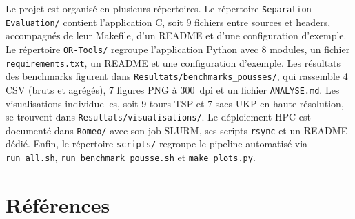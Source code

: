 \documentclass[11pt,a4paper]{article}
\begin{document}
Le projet est organisé en plusieurs répertoires. Le répertoire \texttt{Separation-Evaluation/} contient l'application C, soit 9 fichiers entre sources et headers, accompagnés de leur Makefile, d'un README et d'une configuration d'exemple. Le répertoire \texttt{OR-Tools/} regroupe l'application Python avec 8 modules, un fichier \texttt{requirements.txt}, un README et une configuration d'exemple. Les résultats des benchmarks figurent dans \texttt{Resultats/benchmarks\_pousses/}, qui rassemble 4 CSV (bruts et agrégés), 7 figures PNG à 300~dpi et un fichier \texttt{ANALYSE.md}. Les visualisations individuelles, soit 9 tours TSP et 7 sacs UKP en haute résolution, se trouvent dans \texttt{Resultats/visualisations/}. Le déploiement HPC est documenté dans \texttt{Romeo/} avec son job SLURM, ses scripts \texttt{rsync} et un README dédié. Enfin, le répertoire \texttt{scripts/} regroupe le pipeline automatisé via \texttt{run\_all.sh}, \texttt{run\_benchmark\_pousse.sh} et \texttt{make\_plots.py}.

\section*{Références}
\end{document}
